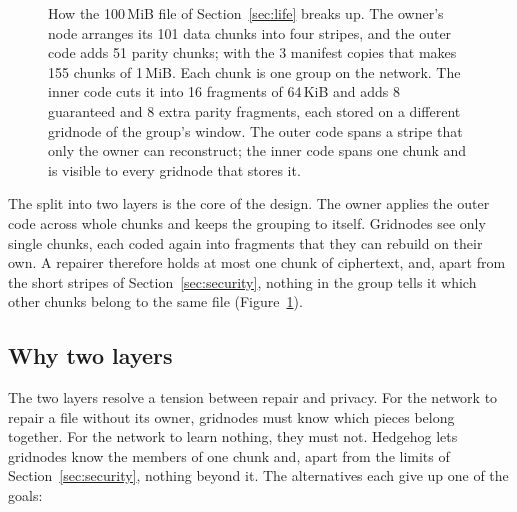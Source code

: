 \documentclass[10pt,a4paper,final]{article}
\begin{document}
\begin{figure}[H]
\caption{How the 100\,MiB file of Section~\ref{sec:life} breaks up. The owner's node arranges its 101 data chunks
into four stripes, and the outer code adds 51 parity chunks; with the 3 manifest copies that makes 155 chunks of
1\,MiB. Each chunk is one group on the network. The inner code cuts it into 16 fragments of 64\,KiB and adds 8
guaranteed and 8 extra parity fragments, each stored on a different gridnode of the group's window. The outer code
spans a stripe that only the owner can reconstruct; the inner code spans one chunk and is visible to every gridnode
that stores it.}
\label{fig:hierarchy}
\end{figure}

The split into two layers is the core of the design. The owner applies the outer code across whole chunks and keeps
the grouping to itself. Gridnodes see only single chunks, each coded again into fragments that they can rebuild on
their own. A repairer therefore holds at most one chunk of ciphertext, and, apart from the short stripes of
Section~\ref{sec:security}, nothing in the group tells it which other chunks belong to the same file
(Figure~\ref{fig:hierarchy}).

\subsection{Why two layers}
\label{sec:why-two}

The two layers resolve a tension between repair and privacy. For the network to repair a file without its owner,
gridnodes must know which pieces belong together. For the network to learn nothing, they must not. Hedgehog lets
gridnodes know the members of one chunk and, apart from the limits of Section~\ref{sec:security}, nothing beyond
it. The alternatives each give up one of the goals:
\end{document}
